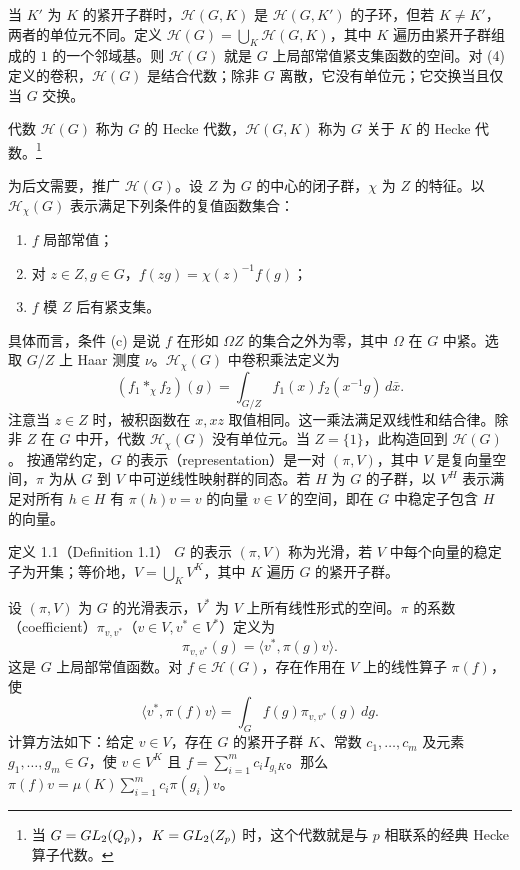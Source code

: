 当 $K'$ 为 $K$ 的紧开子群时，$\mathcal H(G,K)$ 是 $\mathcal H(G,K')$ 的子环，但若 $K\ne K'$，两者的单位元不同。定义 $\mathcal H(G)=\bigcup_K\mathcal H(G,K)$，其中 $K$ 遍历由紧开子群组成的 $1$ 的一个邻域基。则 $\mathcal H(G)$ 就是 $G$ 上局部常值紧支集函数的空间。对 (4) 定义的卷积，$\mathcal H(G)$ 是结合代数；除非 $G$ 离散，它没有单位元；它交换当且仅当 $G$ 交换。

代数 $\mathcal H(G)$ 称为 $G$ 的 Hecke 代数，$\mathcal H(G,K)$ 称为 $G$ 关于 $K$ 的 Hecke 代数。\footnote{当 $G=GL_2(Q_p)$，$K=GL_2(Z_p)$ 时，这个代数就是与 $p$ 相联系的经典 Hecke 算子代数。}

为后文需要，推广 $\mathcal H(G)$。设 $Z$ 为 $G$ 的中心的闭子群，$\chi$ 为 $Z$ 的特征。以 $\mathcal H_\chi(G)$ 表示满足下列条件的复值函数集合：
\begin{enumerate}
\item[(a)] $f$ 局部常值；
\item[(b)] 对 $z\in Z,g\in G$，$f(zg)=\chi(z)^{-1}f(g)$；
\item[(c)] $f$ 模 $Z$ 后有紧支集。
\end{enumerate}
具体而言，条件 (c) 是说 $f$ 在形如 $\Omega Z$ 的集合之外为零，其中 $\Omega$ 在 $G$ 中紧。选取 $G/Z$ 上 Haar 测度 $\nu$。$\mathcal H_\chi(G)$ 中卷积乘法定义为
\[
(f_1*_\chi f_2)(g)=\int_{G/Z}f_1(x)f_2(x^{-1}g)\,d\bar x.\tag{7}
\]
注意当 $z\in Z$ 时，被积函数在 $x,xz$ 取值相同。这一乘法满足双线性和结合律。除非 $Z$ 在 $G$ 中开，代数 $\mathcal H_\chi(G)$ 没有单位元。当 $Z=\{1\}$，此构造回到 $\mathcal H(G)$。
按通常约定，$G$ 的表示（representation）是一对 $(\pi,V)$，其中 $V$ 是复向量空间，$\pi$ 为从 $G$ 到 $V$ 中可逆线性映射群的同态。若 $H$ 为 $G$ 的子群，以 $V^H$ 表示满足对所有 $h\in H$ 有 $\pi(h)v=v$ 的向量 $v\in V$ 的空间，即在 $G$ 中稳定子包含 $H$ 的向量。
\begin{originaltheorem}{定义 1.1（Definition 1.1）}
$G$ 的表示 $(\pi,V)$ 称为光滑，若 $V$ 中每个向量的稳定子为开集；等价地，$V=\bigcup_K V^K$，其中 $K$ 遍历 $G$ 的紧开子群。
\end{originaltheorem}
设 $(\pi,V)$ 为 $G$ 的光滑表示，$V^*$ 为 $V$ 上所有线性形式的空间。$\pi$ 的系数（coefficient）$\pi_{v,v^*}$（$v\in V,v^*\in V^*$）定义为
\[
\pi_{v,v^*}(g)=\langle v^*,\pi(g)v\rangle.\tag{8}
\]
这是 $G$ 上局部常值函数。对 $f\in\mathcal H(G)$，存在作用在 $V$ 上的线性算子 $\pi(f)$，使
\[
\langle v^*,\pi(f)v\rangle=\int_Gf(g)\pi_{v,v^*}(g)\,dg.\tag{9}
\]
计算方法如下：给定 $v\in V$，存在 $G$ 的紧开子群 $K$、常数 $c_1,\ldots,c_m$ 及元素 $g_1,\ldots,g_m\in G$，使 $v\in V^K$ 且 $f=\sum_{i=1}^m c_i I_{g_iK}$。那么 $\pi(f)v=\mu(K)\sum_{i=1}^m c_i\pi(g_i)v$。


